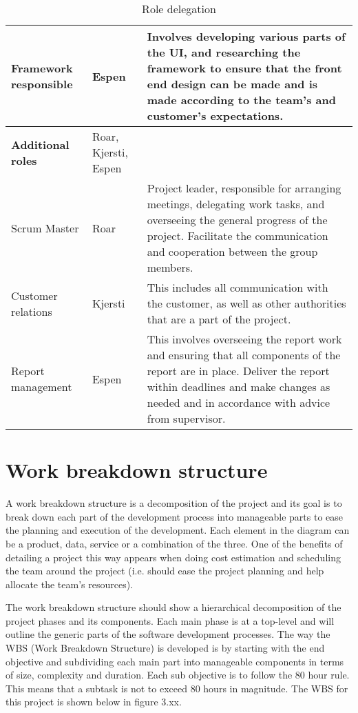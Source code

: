 \begin{table}[!h]
\begin{tabular}{ | p{3.7cm} | p{2.8cm} | p{10.5cm} |}
			Framework responsible & Espen & Involves developing various parts of the UI, and researching the framework to ensure that the front end design can be made and is made according to the team’s and customer’s expectations. \\ \hline
			
			\textbf{Additional roles} & Roar, Kjersti, Espen & \\ \hline
			
			Scrum Master & Roar & Project leader, responsible for arranging meetings, delegating work tasks, and overseeing the general progress of the project. Facilitate the communication and cooperation between the group members. \\ \hline
			
			Customer relations & Kjersti & This includes all communication with the customer, as well as other authorities that are a part of the project. \\ \hline
			
			Report management & Espen & This involves overseeing the report work and ensuring that all components of the report are in place.  Deliver the report within deadlines and make changes as needed and in accordance with advice from supervisor. \\ \hline
		\end{tabular}
	\caption{Role delegation}
	\label{Tab_roles}
\end{table}

\section{Work breakdown structure}

A work breakdown structure is a decomposition of the project and its goal is to break down each part of the development process into manageable parts to ease the planning and execution of the development. Each element in the diagram can be a product, data, service or a combination of the three. One of the benefits of detailing a project this way appears when doing cost estimation and scheduling the team around the project (i.e. should ease the project planning and help allocate the team’s resources).\newline

The work breakdown structure should show a hierarchical decomposition of the project phases and its components. Each main phase is at a top-level and will outline the generic parts of the software development processes. The way the WBS (Work Breakdown Structure) is developed is by starting with the end objective and subdividing each main part into manageable components in terms of size, complexity and duration. Each sub objective is to follow the 80 hour rule. This means that a subtask is not to exceed 80 hours in magnitude.  The WBS for this project is shown below in figure 3.xx.

